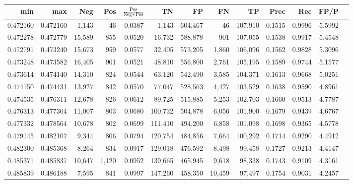 \begin{tabular}{rrrrrrrrrrrrr}
\toprule
     min &      max &    Neg &   Pos & $\frac{\text{Pos}}{\text{Neg}+\text{Pos}}$ &      TN &      FP &      FN &      TP &   Prec &    Rec &   FP/P \\
\midrule
0.472160 & 0.472160 &  1,143 &    46 &                                     0.0387 &   1,143 & 604,467 &      46 & 107,910 & 0.1515 & 0.9996 & 5.5992 \\
0.472278 & 0.472779 & 15,589 &   855 &                                     0.0520 &  16,732 & 588,878 &     901 & 107,055 & 0.1538 & 0.9917 & 5.4548 \\
0.472791 & 0.473240 & 15,673 &   959 &                                     0.0577 &  32,405 & 573,205 &   1,860 & 106,096 & 0.1562 & 0.9828 & 5.3096 \\
0.473248 & 0.473582 & 16,405 &   901 &                                     0.0521 &  48,810 & 556,800 &   2,761 & 105,195 & 0.1589 & 0.9744 & 5.1577 \\
0.473614 & 0.474140 & 14,310 &   824 &                                     0.0544 &  63,120 & 542,490 &   3,585 & 104,371 & 0.1613 & 0.9668 & 5.0251 \\
0.474150 & 0.474431 & 13,927 &   842 &                                     0.0570 &  77,047 & 528,563 &   4,427 & 103,529 & 0.1638 & 0.9590 & 4.8961 \\
0.474535 & 0.476311 & 12,678 &   826 &                                     0.0612 &  89,725 & 515,885 &   5,253 & 102,703 & 0.1660 & 0.9513 & 4.7787 \\
0.476313 & 0.477304 & 11,007 &   803 &                                     0.0680 & 100,732 & 504,878 &   6,056 & 101,900 & 0.1679 & 0.9439 & 4.6767 \\
0.477332 & 0.478564 & 10,678 &   802 &                                     0.0699 & 111,410 & 494,200 &   6,858 & 101,098 & 0.1698 & 0.9365 & 4.5778 \\
0.479145 & 0.482107 &  9,344 &   806 &                                     0.0794 & 120,754 & 484,856 &   7,664 & 100,292 & 0.1714 & 0.9290 & 4.4912 \\
0.482300 & 0.485368 &  8,264 &   834 &                                     0.0917 & 129,018 & 476,592 &   8,498 &  99,458 & 0.1727 & 0.9213 & 4.4147 \\
0.485371 & 0.485837 & 10,647 & 1,120 &                                     0.0952 & 139,665 & 465,945 &   9,618 &  98,338 & 0.1743 & 0.9109 & 4.3161 \\
0.485839 & 0.486188 &  7,595 &   841 &                                     0.0997 & 147,260 & 458,350 &  10,459 &  97,497 & 0.1754 & 0.9031 & 4.2457 \\

\end{tabular}
